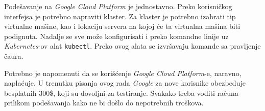 Podešavanje na \textit{Google Cloud Platform} je jednostavno. Preko 
korisničkog interfejsa je potrebno napraviti klaster. Za klaster je 
potrebno izabrati tip virtualne mašine, kao i lokaciju servera na kojoj 
će ta virtualna mašina biti podignuta. Nadalje se sve može konfigurisati 
i preko komandne linije uz \textit{Kubernetes}-ov alat \texttt{kubectl}.
Preko ovog alata se izvršavaju komande sa pravljenje čaura.

Potrebno je napomenuti da se korišćenje \textit{Google Cloud Platform}-e,
naravno, naplaćuje. U trenutku pisanja ovog rada \textit{Google} za nove 
korisnike obezbeđuje besplatnih 300\$, koji su dovoljni za testiranje.
Svakako treba voditi računa prilikom podešavanja kako ne bi došlo do 
nepotrebnih troškova.

